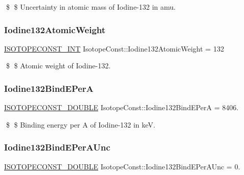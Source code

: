 \$ \$ Uncertainty in atomic mass of Iodine-\/132 in amu. \mbox{\label{group___isotope_const-_iodine-_i132_gaea157853a007d2cc48e13678b0c3d059}} 
\subsubsection{\texorpdfstring{Iodine132\+Atomic\+Weight}{Iodine132AtomicWeight}}
{\footnotesize\ttfamily \mbox{\hyperlink{group___isotope_const-_macros_ga5f18360b3e99483a35c32d789e62621c}{I\+S\+O\+T\+O\+P\+E\+C\+O\+N\+S\+T\+\_\+\+I\+NT}} Isotope\+Const\+::\+Iodine132\+Atomic\+Weight = 132}

\$ \$ Atomic weight of Iodine-\/132. \mbox{\label{group___isotope_const-_iodine-_i132_ga0d6e1603974b97bf6742d0d75bc59f39}} 
\subsubsection{\texorpdfstring{Iodine132\+Bind\+E\+PerA}{Iodine132BindEPerA}}
{\footnotesize\ttfamily \mbox{\hyperlink{group___isotope_const-_macros_ga8f45a7272ce02c0b4c65c44636ed719a}{I\+S\+O\+T\+O\+P\+E\+C\+O\+N\+S\+T\+\_\+\+D\+O\+U\+B\+LE}} Isotope\+Const\+::\+Iodine132\+Bind\+E\+PerA = 8406.}

\$ \$ Binding energy per A of Iodine-\/132 in keV. \mbox{\label{group___isotope_const-_iodine-_i132_ga4cd427f150fd4dad430590f00199e8bf}} 
\subsubsection{\texorpdfstring{Iodine132\+Bind\+E\+Per\+A\+Unc}{Iodine132BindEPerAUnc}}
{\footnotesize\ttfamily \mbox{\hyperlink{group___isotope_const-_macros_ga8f45a7272ce02c0b4c65c44636ed719a}{I\+S\+O\+T\+O\+P\+E\+C\+O\+N\+S\+T\+\_\+\+D\+O\+U\+B\+LE}} Isotope\+Const\+::\+Iodine132\+Bind\+E\+Per\+A\+Unc = 0.}

